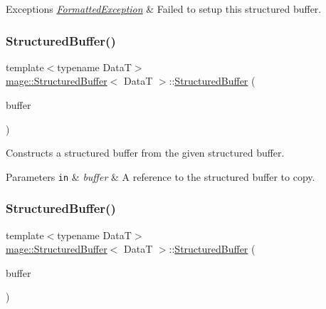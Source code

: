 \begin{DoxyExceptions}{Exceptions}
{\em \hyperlink{classmage_1_1_formatted_exception}{Formatted\+Exception}} & Failed to setup this structured buffer. \\
\hline
\end{DoxyExceptions}
\hypertarget{structmage_1_1_structured_buffer_aa017416099a12305d0177094c768150e}{}\label{structmage_1_1_structured_buffer_aa017416099a12305d0177094c768150e} 
\subsubsection{\texorpdfstring{Structured\+Buffer()}{StructuredBuffer()}\hspace{0.1cm}{\footnotesize\ttfamily [3/4]}}
{\footnotesize\ttfamily template$<$typename DataT$>$ \\
\hyperlink{structmage_1_1_structured_buffer}{mage\+::\+Structured\+Buffer}$<$ DataT $>$\+::\hyperlink{structmage_1_1_structured_buffer}{Structured\+Buffer} (\begin{DoxyParamCaption}\item[{const \hyperlink{structmage_1_1_structured_buffer}{Structured\+Buffer}$<$ DataT $>$ \&}]{buffer }\end{DoxyParamCaption})\hspace{0.3cm}{\ttfamily [delete]}}

Constructs a structured buffer from the given structured buffer.


\begin{DoxyParams}[1]{Parameters}
\mbox{\tt in}  & {\em buffer} & A reference to the structured buffer to copy. \\
\hline
\end{DoxyParams}
\hypertarget{structmage_1_1_structured_buffer_a455bd930f39f5fdf6af4f453694997da}{}\label{structmage_1_1_structured_buffer_a455bd930f39f5fdf6af4f453694997da} 
\subsubsection{\texorpdfstring{Structured\+Buffer()}{StructuredBuffer()}\hspace{0.1cm}{\footnotesize\ttfamily [4/4]}}
{\footnotesize\ttfamily template$<$typename DataT$>$ \\
\hyperlink{structmage_1_1_structured_buffer}{mage\+::\+Structured\+Buffer}$<$ DataT $>$\+::\hyperlink{structmage_1_1_structured_buffer}{Structured\+Buffer} (\begin{DoxyParamCaption}\item[{\hyperlink{structmage_1_1_structured_buffer}{Structured\+Buffer}$<$ DataT $>$ \&\&}]{buffer }\end{DoxyParamCaption})\hspace{0.3cm}{\ttfamily [default]}}

